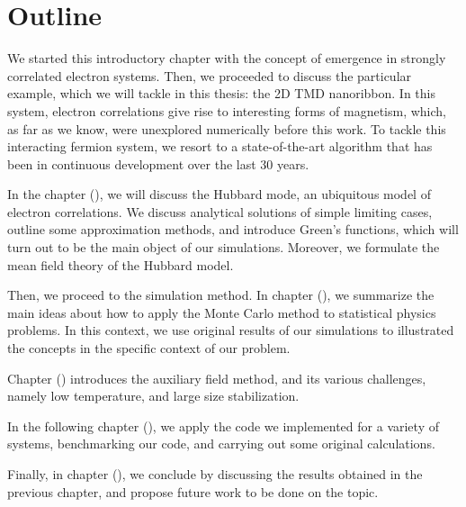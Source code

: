 \section{Outline}
\label{sec:int_outline}

We started this introductory chapter with the concept of emergence in strongly correlated electron systems.
Then, we proceeded to discuss the particular example, which we will tackle in this thesis: the \acs{2D} \acs{TMD} nanoribbon.
In this system, electron correlations give rise to interesting forms of magnetism, which, as far as we know, were unexplored numerically before this work.
To tackle this interacting fermion system, we resort to a  state-of-the-art algorithm that has been in continuous development over the last 30 years.

In the chapter (), we will discuss the Hubbard mode, an ubiquitous model of electron correlations.
We discuss analytical solutions of simple limiting cases, outline some approximation methods, and introduce Green's functions, which will turn out to be the main object of our simulations.
Moreover, we formulate the mean field theory of the Hubbard model.

Then, we proceed to the simulation method.
In chapter (), we summarize the main ideas about how to apply the Monte Carlo method to statistical physics problems.
In this context, we use original results of our simulations to illustrated the concepts in the specific context of our problem.

Chapter () introduces the auxiliary field method, and its various challenges, namely low temperature, and large size stabilization.

In the following chapter (), we apply the code we implemented for a variety of systems, benchmarking our code, and carrying out some original calculations.

Finally, in chapter (), we conclude by discussing the results obtained in the previous chapter, and propose future work to be done on the topic.